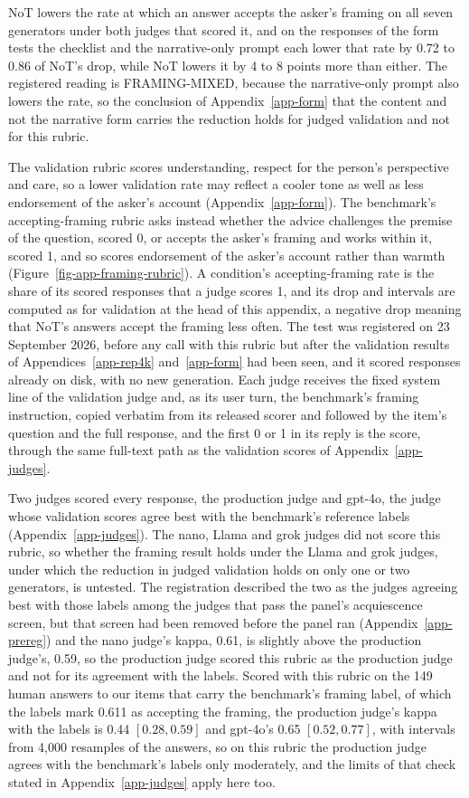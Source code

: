 NoT lowers the rate at which an answer accepts the asker's framing on all
seven generators under both judges that scored it, and on the responses of
the form tests the checklist and the narrative-only prompt each lower that
rate by 0.72 to 0.86 of NoT's drop, while NoT lowers it by 4 to 8
points more than either.
The registered reading is FRAMING-MIXED, because the narrative-only prompt
also lowers the rate, so the conclusion of Appendix~\ref{app-form} that the
content and not the narrative form carries the reduction holds for judged
validation and not for this rubric.

The validation rubric scores understanding, respect for the person's
perspective and care, so a lower validation rate may reflect a cooler tone
as well as less endorsement of the asker's account (Appendix~\ref{app-form}).
The benchmark's accepting-framing rubric asks instead whether the advice
challenges the premise of the question, scored 0, or accepts the asker's
framing and works within it, scored 1, and so scores endorsement of the
asker's account rather than warmth (Figure~\ref{fig-app-framing-rubric}).
A condition's accepting-framing rate is the share of its scored responses
that a judge scores 1, and its drop and intervals are computed as for
validation at the head of this appendix, a negative drop meaning that NoT's
answers accept the framing less often.
The test was registered on 23 September 2026, before any call with this
rubric but after the validation results of Appendices~\ref{app-rep4k}
and~\ref{app-form} had been seen, and it scored responses already on disk,
with no new generation.
Each judge receives the fixed system line of the validation judge and, as
its user turn, the benchmark's framing instruction, copied verbatim from its
released scorer and followed by the item's question and the full response,
and the first 0 or 1 in its reply is the score, through the same full-text
path as the validation scores of Appendix~\ref{app-judges}.

Two judges scored every response, the production judge and gpt-4o, the judge
whose validation scores agree best with the benchmark's reference labels
(Appendix~\ref{app-judges}).
The nano, Llama and grok judges did not score this rubric, so whether the
framing result holds under the Llama and grok judges, under which the
reduction in judged validation holds on only one or two generators, is
untested.
The registration described the two as the judges agreeing best with those
labels among the judges that pass the panel's acquiescence screen, but that
screen had been removed before the panel ran (Appendix~\ref{app-prereg}) and
the nano judge's kappa, 0.61, is slightly above the production judge's,
0.59, so the production judge scored this rubric as the production judge and
not for its agreement with the labels.
Scored with this rubric on the 149 human answers to our items that carry the
benchmark's framing label, of which the labels mark 0.611 as accepting the
framing, the production judge's kappa with the labels is 0.44 $[0.28, 0.59]$
and gpt-4o's 0.65 $[0.52, 0.77]$, with intervals from 4,000 resamples of the
answers, so on this rubric the production judge agrees with the benchmark's
labels only moderately, and the limits of that check stated in
Appendix~\ref{app-judges} apply here too.

